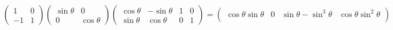 ﻿\documentclass{book} \usepackage{exsheets} \usepackage{xeCJK}
\begin{document}
\begin{solution}
\begin{align*}
                                                                                                                                          \begin{pmatrix}
                                                                                                                                            1&0\\
                                                                                                                                            -1&1
                                                                                                                                          \end{pmatrix}
                                                                                                                                                \begin{pmatrix}
                                                                                                                                                  \sin\theta&0\\
                                                                                                                                                  0&\cos\theta
                                                                                                                                                \end{pmatrix}
                                                                                                                                                     \begin{pmatrix}
                                                                                                                                                       \cos\theta&-\sin\theta&1&0\\
                                                                                                                                                       \sin\theta&\cos\theta&0&1
                                                                                                                                                     \end{pmatrix}=
                                                                                                                                                                                \begin{pmatrix}
                                                                                                                                                                                  \cos\theta\sin\theta&0&\sin\theta-\sin^3\theta&\cos\theta\sin^2\theta\\

\end{pmatrix}
\end{align*}
\end{solution}
\end{document}
